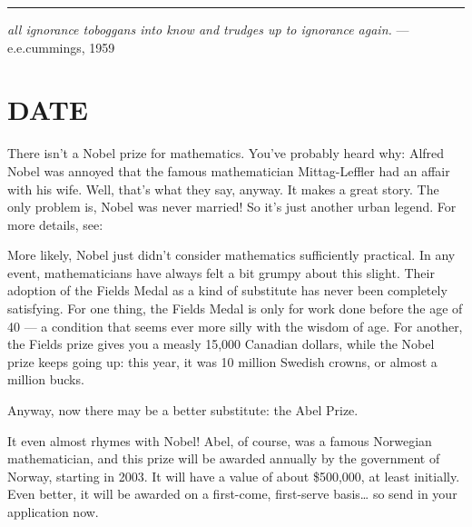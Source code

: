 \documentclass{article}
\def\tightlist{}
\renewcommand{\texttt}[1]{%
  \begingroup
  \ttfamily
  \begingroup\lccode`~=`/\lowercase{\endgroup\def~}{/\discretionary{}{}{}}%
  \begingroup\lccode`~=`[\lowercase{\endgroup\def~}{[\discretionary{}{}{}}%
  \begingroup\lccode`~=`.\lowercase{\endgroup\def~}{.\discretionary{}{}{}}%
  \catcode`/=\active\catcode`[=\active\catcode`.=\active
  \scantokens{#1\noexpand}%
  \endgroup
}
\begin{document}
\begin{center}\rule{0.5\linewidth}{0.5pt}\end{center}

\emph{all ignorance toboggans into know and trudges up to ignorance
again.} --- e.e.cummings, 1959
\hypertarget{week171}{%
\section{DATE}\label{week171}}

There isn't a Nobel prize for mathematics. You've probably heard why:
Alfred Nobel was annoyed that the famous mathematician Mittag-Leffler
had an affair with his wife. Well, that's what they say, anyway. It
makes a great story. The only problem is, Nobel was never married! So
it's just another urban legend. For more details, see:


More likely, Nobel just didn't consider mathematics sufficiently
practical. In any event, mathematicians have always felt a bit grumpy
about this slight. Their adoption of the Fields Medal as a kind of
substitute has never been completely satisfying. For one thing, the
Fields Medal is only for work done before the age of 40 --- a condition
that seems ever more silly with the wisdom of age. For another, the
Fields prize gives you a measly 15,000 Canadian dollars, while the Nobel
prize keeps going up: this year, it was 10 million Swedish crowns, or
almost a million bucks.

Anyway, now there may be a better substitute: the Abel Prize.


It even almost rhymes with Nobel! Abel, of course, was a famous
Norwegian mathematician, and this prize will be awarded annually by the
government of Norway, starting in 2003. It will have a value of about
\$500,000, at least initially. Even better, it will be awarded on a
first-come, first-serve basis\ldots{} so send in your application now.
\end{document}
